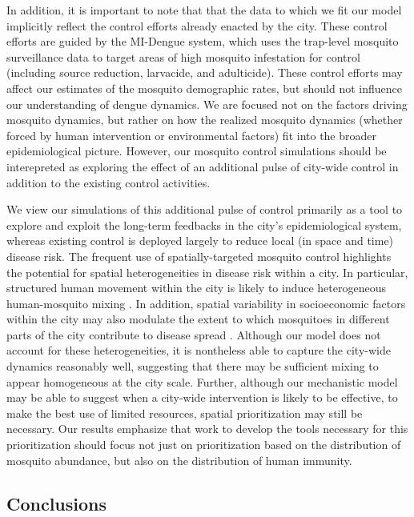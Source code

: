 \documentclass[10pt,letterpaper]{article}
\begin{document}
In addition, it is important to note that that the data to which we fit our model implicitly reflect the control efforts already enacted by the city.
These control efforts are guided by the MI-Dengue system, which uses the trap-level mosquito surveillance data to target areas of high mosquito infestation for control (including source reduction, larvacide, and adulticide)\cite{Eiras2009}.
These control efforts may affect our estimates of the mosquito demographic rates, but should not influence our understanding of dengue dynamics.
We are focused not on the factors driving mosquito dynamics, but rather on how the realized mosquito dynamics (whether forced by human intervention or environmental factors) fit into the broader epidemiological picture.
However, our mosquito control simulations should be interepreted as exploring the effect of an additional pulse of city-wide control in addition to the existing control activities.

We view our simulations of this additional pulse of control primarily as a tool to explore and exploit the long-term feedbacks in the city's epidemiological system, whereas existing control is deployed largely to reduce local (in space and time) disease risk.
The frequent use of spatially-targeted mosquito control highlights the potential for spatial heterogeneities in disease risk within a city.
In particular, structured human movement within the city is likely to induce heterogeneous human-mosquito mixing \cite{Adams2009, Cosner2009a, Stoddard2009}.
In addition, spatial variability in socioeconomic factors within the city may also modulate the extent to which mosquitoes in different parts of the city contribute to disease spread \cite{Mondini2008, Honorio2009, Hu2012, DeMattosAlmeida2007}.
Although our model does not account for these heterogeneities, it is nontheless able to capture the city-wide dynamics reasonably well, suggesting that there may be sufficient mixing to appear homogeneous at the city scale.
Further, although our mechanistic model may be able to suggest when a city-wide intervention is likely to be effective, to make the best use of limited resources, spatial prioritization may still be necessary.
Our results emphasize that work to develop the tools necessary for this prioritization should focus not just on prioritization based on the distribution of mosquito abundance, but also on the distribution of human immunity.

\subsection*{Conclusions}
\end{document}
